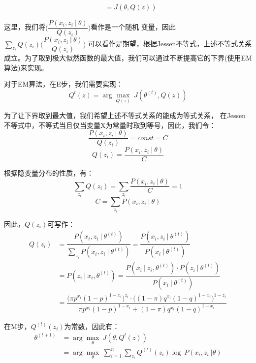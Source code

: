 \documentclass[12pt,a4paper]{article}
\begin{document}
\begin{spacing}{1.3}
\begin{equation}
\begin{split}
        &=J(\theta,Q(z))  \nonumber
    \end{split}
\end{equation}
\par 这里，我们将$\biggl(\dfrac{P(x_{i},z_{i}\ | \ \theta)}{Q(z_{i})} \biggr)$看作是一个随机
变量，因此$\sum\limits_{z_{i}}Q(z_{i})\biggl(\dfrac{P(x_{i},z_{i}\ | \ \theta)}{Q(z_{i})} \biggr) $
可以看作是期望，根据Jessen不等式，上述不等式关系成立。为了取到极大似然函数的最大值，我们可以通过不断提高它的下界(使用EM算法)来实现。
\par 对于EM算法，在E步，我们需要实现：
$$Q^{t}(z) = \arg\max\limits_{Q(z)}\ J(\theta^{(t)},Q(z)) $$
\par 为了让下界取到最大值，我们希望上述不等式关系的能成为等式关系，
在Jessen不等式中，不等式当且仅当变量X为常量时取到等号，因此，我们令：
$$ \dfrac{P(x_{i},z_{i}\ | \ \theta)}{Q(z_{i})} = const = C$$
$$Q(z_{i})=\dfrac{P(x_{i},z_{i}\ | \ \theta)}{C} $$
\par 根据隐变量分布的性质，有：
$$\sum\limits_{z_{i}} Q(z_{i}) = \sum\limits_{z_{i}} \dfrac{P(x_{i},z_{i}\ | \ \theta)}{C} = 1$$
$$C = \sum\limits_{z_{i}} P(x_{i},z_{i}\ | \ \theta) $$ 
\par 因此，$Q(z_{i})$可写作：
\begin{equation}
    \begin{split}
        Q(z_{i}) & = \dfrac{P(x_{i},z_{i}\ | \ \theta^{(t)})}{\sum\limits_{z_{i}}P(x_{i},z_{i}\ | \ \theta^{(t)})} 
         = \dfrac{P(x_{i},z_{i}\ | \ \theta^{(t)})}{P(x_{i} \ | \ \theta^{(t)})} \\
        &=P(z_{i} \ | \ x_{i},\theta^{(t)}) = \dfrac{P(x_{i}\ | \ z_{i},\theta^{(t)})·P(z_{i}\ | \ \theta^{(t)})}{P(x_{i} \ | \ \theta^{(t)})} \\
        & = \dfrac{  \biggl( \pi p^{x_{i}}(1-p)^{1-x_{i}} \biggr)^{z_{i}} ·
        \biggl( (1-\pi)q^{x_{i}}(1-q)^{1-x_{i}} \biggr)^{1-z_{i}}  }
        {\pi p^{x_{i}}(1-p)^{1-x_{i}}+(1-\pi)q^{x_{i}}(1-q)^{1-x_{i}}} \nonumber 
    \end{split}
\end{equation}
\par 在M步，$Q^{(t)}(z_{i})$为常数，因此有：
\begin{equation}
    \begin{split}
        \theta^{(t+1)} &= \arg\max\limits_{\theta} \ J(\theta,Q^{t}(z)) \\
        & =  \arg\max\limits_{\theta} \ \sum\limits_{i=1}^{n} \sum\limits_{z_{i}}   Q^{(t)}(z_{i}) \log \ P(x_{i},z_{i} \ | \theta) \\

\end{split}
\end{equation}
\end{spacing}
\end{document}

